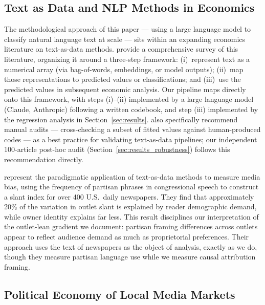 \documentclass[12pt]{article}
\begin{document}
\subsection*{Text as Data and NLP Methods in Economics}

The methodological approach of this paper --- using a large language
model to classify natural language text at scale --- sits within an
expanding economics literature on text-as-data methods.
\citet{gentzkow2019} provide a comprehensive survey of this literature,
organizing it around a three-step framework: (i)~represent text as a
numerical array (via bag-of-words, embeddings, or model outputs);
(ii)~map those representations to predicted values or classifications;
and (iii)~use the predicted values in subsequent economic analysis.
Our pipeline maps directly onto this framework, with steps (i)--(ii)
implemented by a large language model (Claude, Anthropic) following a
written codebook, and step (iii) implemented by the regression analysis
in Section~\ref{sec:results}.  \citet{gentzkow2019} also specifically
recommend manual audits --- cross-checking a subset of fitted values
against human-produced codes --- as a best practice for validating
text-as-data pipelines; our independent 100-article post-hoc audit
(Section~\ref{sec:results_robustness}) follows this recommendation
directly.

\citet{gentzkow2010} represent the paradigmatic application of
text-as-data methods to measure media bias, using the frequency of
partisan phrases in congressional speech to construct a slant index for
over 400 U.S.\ daily newspapers.  They find that approximately 20\% of
the variation in outlet slant is explained by reader demographic demand,
while owner identity explains far less.  This result disciplines our
interpretation of the outlet-lean gradient we document: partisan framing
differences across outlets appear to reflect audience demand as much as
proprietorial preferences.  Their approach uses the text of newspapers
as the object of analysis, exactly as we do, though they measure
partisan language use while we measure causal attribution framing.

\subsection*{Political Economy of Local Media Markets}
\end{document}
